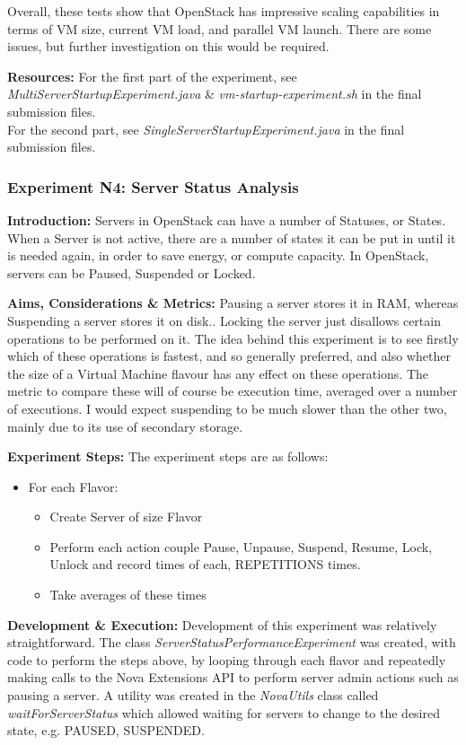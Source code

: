 Overall, these tests show that OpenStack has impressive scaling capabilities in terms of VM size, current VM load, and parallel VM launch. There are some issues, but further investigation on this would be required. 

\textbf{Resources:}
For the first part of the experiment, see \textit{MultiServerStartupExperiment.java} \& \textit{vm-startup-experiment.sh} in the final submission files. \\
For the second part, see \textit{SingleServerStartupExperiment.java} in the final submission files. 

\subsubsection{Experiment N4: Server Status Analysis}
\textbf{Introduction:}
Servers in OpenStack can have a number of Statuses, or States. When a Server is not active, there are a number of states it can be put in until it is needed again, in order to save energy, or compute capacity. In OpenStack, servers can be Paused, Suspended or Locked. 

\textbf{Aims, Considerations \& Metrics:}
Pausing a server stores it in RAM, whereas Suspending a server stores it on disk.\cite{nova-admin-server}. Locking the server just disallows certain operations to be performed on it. The idea behind this experiment is to see firstly which of these operations is fastest, and so generally preferred, and also whether the size of a Virtual Machine flavour has any effect on these operations. The metric to compare these will of course be execution time, averaged over a number of executions. 
I would expect suspending to be much slower than the other two, mainly due to its use of secondary storage. 

\textbf{Experiment Steps:} 
The experiment steps are as follows:
\begin{itemize}
\item For each Flavor:
	\begin{itemize}
	\item Create Server of size Flavor
	\item Perform each action couple {Pause, Unpause}, {Suspend, Resume}, {Lock, Unlock} and record times of each, REPETITIONS times.
	\item Take averages of these times 
	\end{itemize}
\end{itemize}
\textbf{Development \& Execution:}
Development of this experiment was relatively straightforward. The class \textit{ServerStatusPerformanceExperiment} was created, with code to perform the steps above, by looping through each flavor and repeatedly making calls to the Nova Extensions API to perform server admin actions such as pausing a server. A utility was created in the \textit{NovaUtils} class called \textit{waitForServerStatus} which allowed waiting for servers to change to the desired state, e.g. PAUSED, SUSPENDED. 

